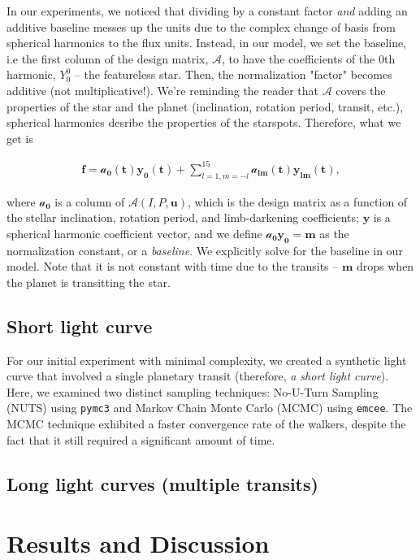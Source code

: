 \documentclass[twocolumn]{aastex631}
\begin{document}
In our experiments, we noticed that dividing by a constant factor \emph{and} adding an additive baseline messes up the units due to the complex change of 
basis from spherical harmonics to the flux units. Instead, in our model, we set the baseline, i.e the first column of the design matrix, $\pmb{\mathcal{A}}$, 
to have the coefficients of the 0th harmonic, $Y^0_0$ -- the featureless star. Then, the normalization "factor" becomes additive (not multiplicative!). We're reminding 
the reader that $\pmb{\mathcal{A}}$ covers the properties of the star and the planet (inclination, rotation period, transit, etc.), spherical harmonics desribe the
properties of the starspots. Therefore, what we get is
%
\begin{linenomath}\begin{align}
        \label{eq:fAy}
        \mathbf{f} = \pmb{\mathcal{a}_0(t)} \mathbf{y_0(t)} + \sum_{l=1, m=-l}^{15} \pmb{\mathcal{a}_{lm}(t)} \mathbf{y_{lm}(t)},
    \end{align}\end{linenomath}
%
where $\pmb{\mathcal{a}_0}$ is a column of $\pmb{\mathcal{A}}(I, P, \mathbf{u})$, which is the design matrix as a function of the stellar inclination, rotation period, 
and limb-darkening coefficients; $\mathbf{y}$ is a spherical harmonic coefficient vector, and we define $\pmb{\mathcal{a}_0} \mathbf{y_0} = \pmb{m}$ 
as the normalization constant, or a \emph{baseline}. We explicitly solve for the baseline in our model. Note that it is not constant with time due to the transits --
$\pmb{m}$ drops when the planet is transitting the star.


\subsection{Short light curve}
For our initial experiment with minimal complexity, we created a synthetic light curve that involved a single planetary transit (therefore, 
\emph{a short light curve}). Here, we examined two distinct sampling techniques: No-U-Turn Sampling (NUTS) using \texttt{pymc3} and Markov Chain Monte Carlo (MCMC) 
using \texttt{emcee}. The MCMC technique exhibited a faster convergence rate of the walkers, despite the fact that it still required a significant amount of time.
\subsection{Long light curves (multiple transits)}
\section{Results and Discussion}


\end{document}
